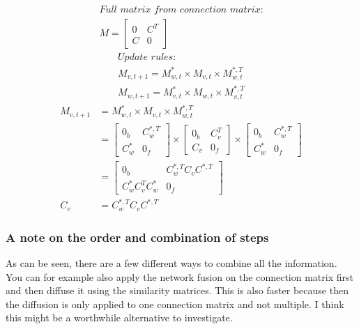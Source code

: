 \documentclass{article}
\begin{document}
\begin{gather*}
    \textit{Full matrix from connection matrix:} \\
    M = \begin{bmatrix}
            0 & C^T \\
            C & 0
        \end{bmatrix} 
\end{gather*}
\begin{gather*}
    \textit{Update rules:} \\
    M_{v, t+1} = M^*_{w, t} \times M_{v, t} \times M^{*,T}_{w, t} \\
    M_{w, t+1} = M^*_{v, t} \times M_{w, t} \times M^{*,T}_{v, t}
\end{gather*}
\begin{align*}
    M_{v, t+1} &= M^*_{w, t} \times M_{v, t} \times M^{*,T}_{w, t} \\
               &= \begin{bmatrix}
                   0_b & C^{*,T}_w \\
                   C^*_w & 0_f
               \end{bmatrix} \times 
               \begin{bmatrix}
                   0_b & C^T_v \\
                   C_v & 0_f
               \end{bmatrix} \times
               \begin{bmatrix} 
                   0_b & C^{*,T}_w \\
                   C^*_w & 0_f
               \end{bmatrix} \\
               &= \begin{bmatrix}
                   0_b & C^{*,T}_w C_v C^{*,T} \\
                   C^*_w C^T_v C^*_w & 0_f
                   \end{bmatrix} \\
           C_v &= C^{*,T}_w C_v C^{*,T}
\end{align*}

\subsubsection{A note on the order and combination of steps}

As can be seen, there are a few different ways to combine all the information.
You can for example also apply the network fusion on the connection matrix
first and then diffuse it using the similarity matrices. This is also 
faster because then the diffusion is only applied to one connection matrix
and not multiple. I think this might be a worthwhile alternative to investigate.
\end{document}

